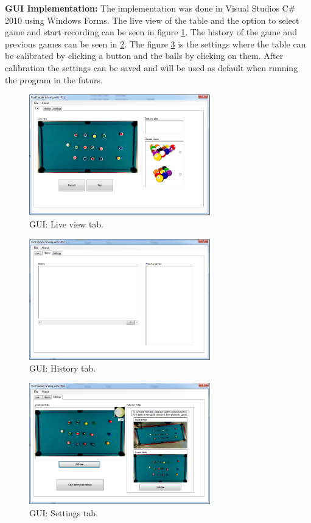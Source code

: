\textbf{GUI Implementation:}
The implementation was done in Visual Studios C\# 2010 using Windows Forms. The live view of the table and the option to select game and start recording can be seen in figure \ref{fig:guilive}. The history of the game and previous games can be seen in \ref{fig:guihist}. The figure \ref{fig:guisett} is the settings where the table can be calibrated by clicking a button and the balls by clicking on them. After calibration the settings can be saved and will be used as default when running the program in the futurs.

\begin{figure}[htpb]
\begin{center}
\leavevmode
\includegraphics[width=0.7\textwidth]{images/prototype/live}
\end{center}
\caption{GUI: Live view tab.}
\label{fig:guilive}
\end{figure}

\begin{figure}[htpb]
\begin{center}
\leavevmode
\includegraphics[width=0.7\textwidth]{images/prototype/hist}
\end{center}
\caption{GUI: History tab.}
\label{fig:guihist}
\end{figure}

\begin{figure}[htpb]
\begin{center}
\leavevmode
\includegraphics[width=0.7\textwidth]{images/prototype/settings}
\end{center}
\caption{GUI: Settings tab.}
\label{fig:guisett}
\end{figure}